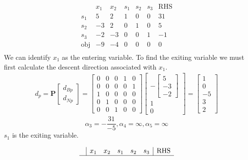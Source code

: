 \documentclass[11pt]{article}
\begin{document}
\begin{center}
  \[
  \begin{array}{c|ccccc|c}
    & x_1 & x_2 & s_1 & s_2 & s_3 & \text{RHS} \\
    \hline
    s_1 & 5 & 2 & 1 & 0 & 0 & 31 \\
    s_2 & -3 & 2 & 0 & 1 & 0 & 5 \\
    s_3 & -2 & -3 & 0 & 0 & 1 & -1 \\
    \hline
    \text{obj} & -9 & -4 & 0 & 0 & 0 & 0 \\
  \end{array}
  \]
  We can identify $x_1$ as the entering variable.
  To find the exiting variable we must first calculate the descent direction associated with $x_1$.
  \begin{align*}
    d_p =\textbf{P}
    \begin{bmatrix}
       d_{Bp} \\ d_{Np}
    \end{bmatrix}
    = 
    \begin{bmatrix}
      0 & 0 & 0 & 1 & 0 \\
      0 & 0 & 0 & 0 & 1 \\
      1 & 0 & 0 & 0 & 0 \\
      0 & 1 & 0 & 0 & 0 \\
      0 & 0 & 1 & 0 & 0
    \end{bmatrix}
    \begin{bmatrix}
      -
      \begin{bmatrix}
        5 \\ -3 \\ -2
      \end{bmatrix} \\
      1 \\ 0
    \end{bmatrix}
    =
    \begin{bmatrix}
      1 \\ 0 \\ -5 \\ 3 \\ 2
    \end{bmatrix}
  \end{align*}
  \[
    \alpha_3 = -\frac{31}{-5}, \alpha_4 = \infty, \alpha_5 = \infty
  \]
  $s_1$ is the exiting variable.
  \begin{center}
    \[
    \begin{array}{c|ccccc|c}
      & x_1 & x_2 & s_1 & s_2 & s_3 & \text{RHS} \\
      \hline

\end{array}\]
\end{center}
\end{center}
\end{document}
